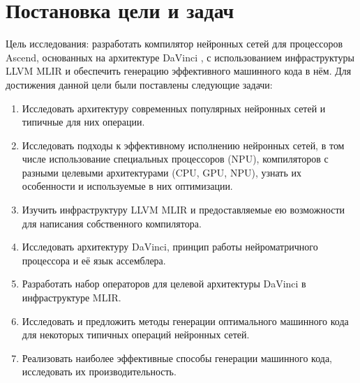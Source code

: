\section{Постановка цели и задач}
\label{sec:Goals} 

Цель исследования: разработать компилятор нейронных сетей для процессоров
Ascend, основанных на архитектуре DaVinci \cite{ascend}, с использованием инфраструктуры
LLVM MLIR \cite{mlir-doc} и обеспечить генерацию эффективного машинного кода в нём.
Для достижения данной цели были поставлены следующие задачи:

\begin{enumerate}
    \item Исследовать архитектуру современных популярных нейронных сетей
          и типичные для них операции.
    \item Исследовать подходы к эффективному исполнению нейронных сетей,
          в том числе использование специальных процессоров (NPU),
          компиляторов с разными целевыми архитектурами (CPU, GPU, NPU),
          узнать их особенности и используемые в них оптимизации.
    \item Изучить инфраструктуру LLVM MLIR и предоставляемые ею возможности
          для написания собственного компилятора.
    \item Исследовать архитектуру DaVinci, принцип работы нейроматричного
          процессора и её язык ассемблера.
    \item Разработать набор операторов для целевой архитектуры DaVinci в
          инфраструктуре MLIR.
    \item Исследовать и предложить методы генерации оптимального машинного
          кода для некоторых типичных операций нейронных сетей.
    \item Реализовать наиболее эффективные способы генерации машинного кода,
          исследовать их производительность.
\end{enumerate}

\newpage
